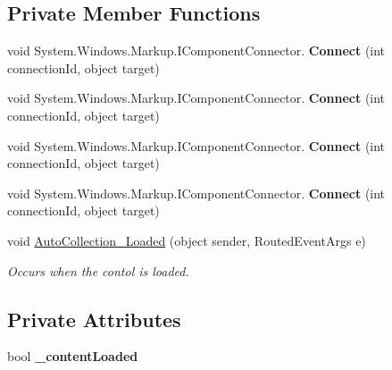 \subsection*{Private Member Functions}
\begin{DoxyCompactItemize}
\item 
\mbox{\label{class_wpf_handler_1_1_u_i_1_1_controls_1_1_auto_collection_ae27a9f5902ca092611b2dfcae06aac84}} 
void System.\+Windows.\+Markup.\+I\+Component\+Connector. {\bfseries Connect} (int connection\+Id, object target)
\item 
\mbox{\label{class_wpf_handler_1_1_u_i_1_1_controls_1_1_auto_collection_ae27a9f5902ca092611b2dfcae06aac84}} 
void System.\+Windows.\+Markup.\+I\+Component\+Connector. {\bfseries Connect} (int connection\+Id, object target)
\item 
\mbox{\label{class_wpf_handler_1_1_u_i_1_1_controls_1_1_auto_collection_ae27a9f5902ca092611b2dfcae06aac84}} 
void System.\+Windows.\+Markup.\+I\+Component\+Connector. {\bfseries Connect} (int connection\+Id, object target)
\item 
\mbox{\label{class_wpf_handler_1_1_u_i_1_1_controls_1_1_auto_collection_ae27a9f5902ca092611b2dfcae06aac84}} 
void System.\+Windows.\+Markup.\+I\+Component\+Connector. {\bfseries Connect} (int connection\+Id, object target)
\item 
void \mbox{\hyperlink{class_wpf_handler_1_1_u_i_1_1_controls_1_1_auto_collection_a1a849b598ba5dadbb9466b3b758377cf}{Auto\+Collection\+\_\+\+Loaded}} (object sender, Routed\+Event\+Args e)
\begin{DoxyCompactList}\small\item\em Occurs when the contol is loaded. \end{DoxyCompactList}\end{DoxyCompactItemize}
\subsection*{Private Attributes}
\begin{DoxyCompactItemize}
\item 
\mbox{\label{class_wpf_handler_1_1_u_i_1_1_controls_1_1_auto_collection_a9b1198e458151ced3611a7f6062506e9}} 
bool {\bfseries \+\_\+content\+Loaded}
\end{DoxyCompactItemize}
